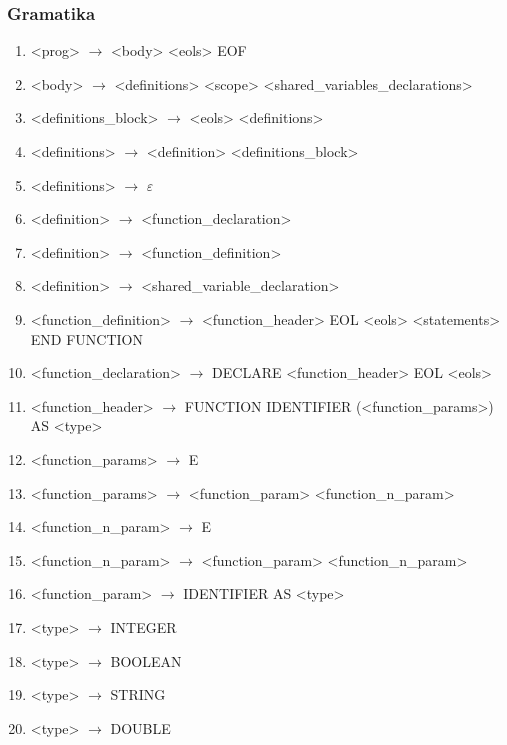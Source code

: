 \subsubsection{Gramatika}
\begin{normalsize}
\begin{enumerate}
\item <prog> $\rightarrow$ <body> <eols> EOF
\item <body> $\rightarrow$ <definitions> <scope> <shared\_variables\_declarations>

\item <definitions\_block> $\rightarrow$ <eols> <definitions>

\item <definitions> $\rightarrow$ <definition> <definitions\_block>
\item <definitions> $\rightarrow$ $\varepsilon$

\item <definition> $\rightarrow$ <function\_declaration>
\item <definition> $\rightarrow$ <function\_definition>
\item <definition> $\rightarrow$ <shared\_variable\_declaration>

\item <function\_definition> $\rightarrow$ <function\_header> EOL <eols> <statements> END FUNCTION
\item <function\_declaration> $\rightarrow$ DECLARE <function\_header> EOL <eols>

\item <function\_header> $\rightarrow$ FUNCTION IDENTIFIER (<function\_params>) AS <type>

\item <function\_params> $\rightarrow$ E
\item <function\_params> $\rightarrow$ <function\_param> <function\_n\_param>

\item <function\_n\_param> $\rightarrow$ E
\item <function\_n\_param> $\rightarrow$ <function\_param> <function\_n\_param>

\item <function\_param> $\rightarrow$ IDENTIFIER AS <type>


\item <type> $\rightarrow$ INTEGER
\item <type> $\rightarrow$ BOOLEAN
\item <type> $\rightarrow$ STRING
\item <type> $\rightarrow$ DOUBLE


\end{enumerate}
\end{normalsize}
